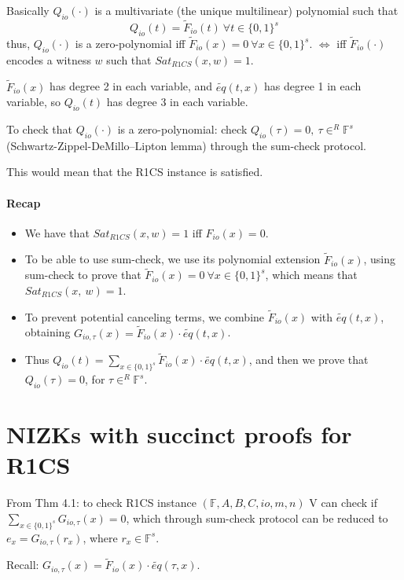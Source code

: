 \documentclass{article}
\theoremstyle{definition}
\begin{document}
Basically $Q_{io}(\cdot)$ is a multivariate (the unique multilinear) polynomial such that
$$Q_{io}(t) = \widetilde{F}_{io}(t) ~\forall t \in \{0,1\}^s$$
thus, $Q_{io}(\cdot)$ is a zero-polynomial iff $\widetilde{F}_{io}(x)=0 ~\forall x\in \{0,1\}^s$.
$\Longleftrightarrow$ iff $\widetilde{F}_{io}(\cdot)$ encodes a witness $w$ such that $Sat_{R1CS}(x, w)=1$.

$\widetilde{F}_{io}(x)$ has degree 2 in each variable, and $\widetilde{eq}(t, x)$ has degree 1 in each variable, so $Q_{io}(t)$ has degree 3 in each variable.

To check that $Q_{io}(\cdot)$ is a zero-polynomial: check $Q_{io}(\tau)=0,~ \tau \in^R \mathbb{F}^s$ (Schwartz-Zippel-DeMillo–Lipton lemma) through the sum-check protocol.

This would mean that the R1CS instance is satisfied.


\paragraph{Recap}
\begin{itemize}
	\item[] We have that $Sat_{R1CS}(x,w)=1$ iff $F_{io}(x)=0$.
	\item[] To be able to use sum-check, we use its polynomial extension $\widetilde{F}_{io}(x)$, using sum-check to prove that $\widetilde{F}_{io}(x) =0 ~\forall x \in \{0, 1\}^s$, which means that $Sat_{R1CS}(x,~w)=1$.
	\item[] To prevent potential canceling terms, we combine $\widetilde{F}_{io}(x)$ with $\widetilde{eq}(t, x)$, obtaining $G_{io, \tau}(x)= \widetilde{F}_{io}(x) \cdot \widetilde{eq}(t, x)$.
	\item[] Thus $Q_{io}(t)= \sum_{x \in \{0,1\}^s} \widetilde{F}_{io}(x) \cdot \widetilde{eq}(t, x)$, and then we prove that $Q_{io}(\tau)=0$, for $\tau \in^R \mathbb{F}^s$.
\end{itemize}

\section{NIZKs with succinct proofs for R1CS}

From Thm 4.1: to check R1CS instance $(\mathbb{F}, A, B, C, io, m, n)$ V can check if
$\sum_{x \in \{0,1\}^s} G_{io, \tau} (x) = 0$, which through sum-check protocol can be reduced to $e_x = G_{io, \tau} (r_x)$, where $r_x \in \mathbb{F}^s$.

Recall: $G_{io, \tau}(x) = \widetilde{F}_{io}(x) \cdot \widetilde{eq}(\tau, x)$.
\end{document}
